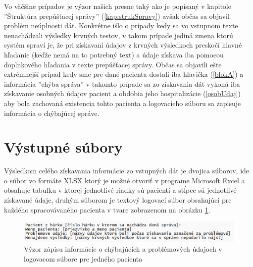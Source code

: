 Vo väčšine prípadov je výzor našich presne taký ako je popísaný v kapitole ''Štruktúra prepúšťacej správy'' (\ref{kap:strukSpravy}) avšak občas sa objavil problém neúplnosti dát. Konkrétne išlo o prípady kedy sa vo vstupnom texte nenachádzali výsledky krvných testov, v takom prípade jediná zmena ktorú systém spraví je, že pri získavaní údajov z krvných výsledkoch preskočí hlavné hľadanie (keďže nemá na to potrebný text) a údaje získava iba pomocou doplnkového hľadania v texte prepúšťacej správy. Občas sa objavili ešte extrémnejší prípad kedy sme pre dané pacienta dostali iba hlavička (\ref{blokA})  a informácia ''chýba správa'' v takomto prípade sa zo získavania dát vykoná iba získavanie osobných údajov pacient a obdobia jeho hospitalizácie (\ref{osobUdaj}) aby bola zachovaná existencia tohto pacienta a logovacieho súboru sa zapisuje informácia o chýbajúcej správe.

\section{Výstupné súbory}   

Výsledkom celého získavania informácie zo vstupných dát je dvojica súborov, ide o súbor vo formáte XLSX ktorý je možné otvoriť v programe Microsoft Excel a obsahuje tabuľku v ktorej jednotlivé riadky sú pacienti a stĺpce sú jednotlivé získavané údaje, druhým súborom je textový logovací súbor obsahujúci pre každého spracovávaného pacienta v tvare zobrazenom na obrázku \ref{obr:log}.

\begin{figure}
	\centerline{\includegraphics[width=1\textwidth]{images/log_subor}}
	\caption[Logovací súbor]{Výzor zápisu informácie o chýbajúcich a problémových údajoch v logovacom súbore pre jedného pacienta}
	\label{obr:log}
\end{figure}    
